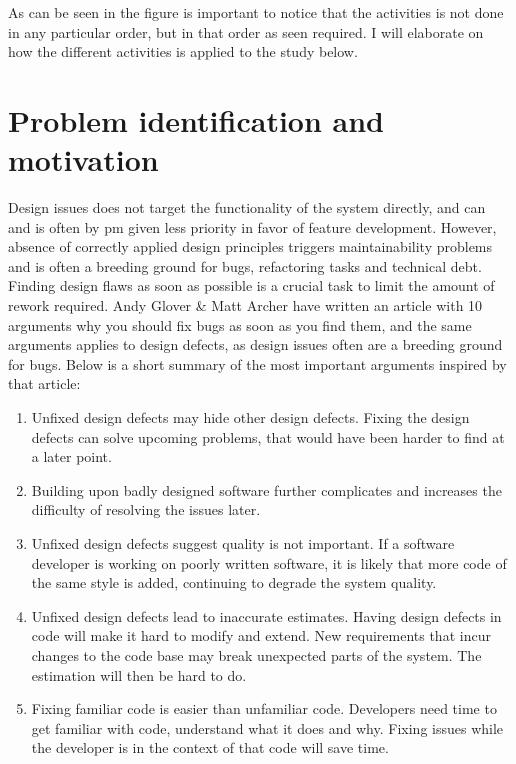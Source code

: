 \documentclass{report}
\begin{document}
As can be seen in the figure is important to notice that the activities is not done in any particular order, but in that order as seen required. I will elaborate on how the different activities is applied to the study below. 

\section{Problem identification and motivation}
\label{problem-identification-and-motiviation}

Design issues does not target the functionality of the system directly, and can and is often by \gls{pm} given less priority in favor of feature development. However, absence of correctly applied design principles triggers maintainability problems and is often a breeding ground for bugs, refactoring tasks and technical debt\cite{}. Finding design flaws as soon as possible is a crucial task to limit the amount of rework required. Andy Glover \& Matt Archer have written an article with 10 arguments why you should fix bugs as soon as you find them\cite{10reasons}, and the same arguments applies to design defects, as design issues often are a breeding ground for bugs. Below is a short summary of the most important arguments inspired by that article:

\begin{enumerate}
    \item Unfixed design defects may hide other design defects. Fixing the design defects can solve upcoming problems, that would have been harder to find at a later point.
    \item Building upon badly designed software further complicates and increases the difficulty of resolving the issues later.
    \item Unfixed design defects suggest quality is not important. If a software developer is working on poorly written software, it is likely that more code of the same style is added, continuing to degrade the system quality.
    \item Unfixed design defects lead to inaccurate estimates. Having design defects in code will make it hard to modify and extend. New requirements that incur changes to the code base may break unexpected parts of the system. The estimation will then be hard to do.
    \item Fixing familiar code is easier than unfamiliar code. Developers need time to get familiar with code, understand what it does and why. Fixing issues while the developer is in the context of that code will save time.
\end{enumerate}
\end{document}
